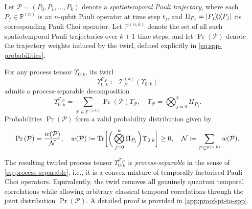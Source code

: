 Let \(\mathcal{P} = (P_0, P_1, \ldots, P_k)\) denote a \emph{spatiotemporal Pauli trajectory}, where each \(P_j \in \mathbb{P}^{(n)}\) is an \(n\)-qubit Pauli operator at time step \(t_j\), and \(\Pi_{P_j} = | P_j \rangle \! \rangle \! \langle \! \langle P_j |\) its corresponding Pauli Choi operator. Let \(\mathbb{P}^{(n,k)}\) denote the set of all such spatiotemporal Pauli trajectories over \(k+1\) time steps, and let \(\Pr{(\mathcal{P})}\) denote the trajectory weights induced by the twirl, defined explicitly in \cref{eq:spp-probabilities}.
\begin{theorem}\label{thm:pt-to-spp}
  For any process tensor \(\Upsilon_{0:k}\), its twirl
  \begin{equation}
    \Upsilon_{0:k}^{\mathcal{T}_P} \coloneq \mathcal{T}_P^{(k)}(\Upsilon_{0:k})
  \end{equation}
  admits a process-separable decomposition
  \begin{equation}
    \Upsilon_{0:k}^{\mathcal{T}_P} = \sum_{\mathcal{P}\in\mathbb{P}^{(n,k)}}\Pr{(\mathcal{P})}\Upsilon_\mathcal{P}, \quad \Upsilon_\mathcal{P} = \bigotimes_{j=0}^k\Pi_{P_j}.
  \end{equation}
  Probabilities \(\Pr{(\mathcal{P})}\) form a valid probability distribution given by
  \begin{equation}\label{eq:spp-probabilities}
    \Pr{(\mathcal{P})} = \frac{w(\mathcal{P})}{\mathcal{N}}, \quad w(\mathcal{P}) \coloneq \mathrm{Tr}\bigg[\bigg(\bigotimes_{j=0}^k\Pi_{P_j}\bigg)\Upsilon_{0:k}\bigg] \geq 0, \quad \mathcal{N} \coloneq \sum_{\mathcal{P}\in\mathbb{P}^{(n,k)}} w(\mathcal{P}).
  \end{equation}
\end{theorem}
The resulting twirled process tensor \(\Upsilon_{0:k}^{\mathcal{T}_P}\) is \emph{process-separable} in the sense of \cref{eq:process-separable}, i.e., it is a convex mixture of temporally factorised Pauli Choi operators. Equivalently, the twirl removes all genuinely quantum temporal correlations while allowing arbitrary classical temporal correlations through the joint distribution \(\Pr{(\mathcal{P})}\). A detailed proof is provided in \cref{app:proof-pt-to-spp}.

